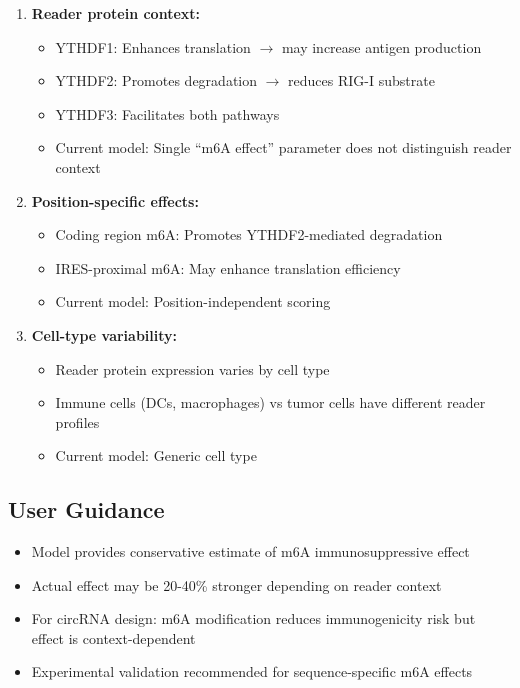 \documentclass{article}
\begin{document}
\begin{enumerate}
\item \textbf{Reader protein context:}
\begin{itemize}
\item YTHDF1: Enhances translation $\rightarrow$ may increase antigen production
\item YTHDF2: Promotes degradation $\rightarrow$ reduces RIG-I substrate
\item YTHDF3: Facilitates both pathways
\item Current model: Single ``m6A effect'' parameter does not distinguish reader context
\end{itemize}

\item \textbf{Position-specific effects:}
\begin{itemize}
\item Coding region m6A: Promotes YTHDF2-mediated degradation
\item IRES-proximal m6A: May enhance translation efficiency
\item Current model: Position-independent scoring
\end{itemize}

\item \textbf{Cell-type variability:}
\begin{itemize}
\item Reader protein expression varies by cell type
\item Immune cells (DCs, macrophages) vs tumor cells have different reader profiles
\item Current model: Generic cell type
\end{itemize}
\end{enumerate}

\subsection{User Guidance}
\begin{itemize}
\item Model provides conservative estimate of m6A immunosuppressive effect
\item Actual effect may be 20-40\% stronger depending on reader context
\item For circRNA design: m6A modification reduces immunogenicity risk but effect is context-dependent
\item Experimental validation recommended for sequence-specific m6A effects
\end{itemize}



\end{document}
